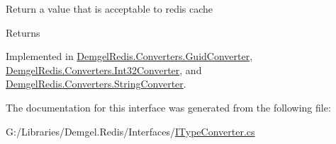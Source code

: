 Return a value that is acceptable to redis cache 

\begin{DoxyReturn}{Returns}

\end{DoxyReturn}


Implemented in \hyperlink{class_demgel_redis_1_1_converters_1_1_guid_converter_a7ac6e5ee049d98717b85caddb7f7403c}{Demgel\+Redis.\+Converters.\+Guid\+Converter}, \hyperlink{class_demgel_redis_1_1_converters_1_1_int32_converter_a318eff3512a40de205c1c518c75f2d9d}{Demgel\+Redis.\+Converters.\+Int32\+Converter}, and \hyperlink{class_demgel_redis_1_1_converters_1_1_string_converter_a94f61749fc10565e355dd19b6ccfbf6a}{Demgel\+Redis.\+Converters.\+String\+Converter}.



The documentation for this interface was generated from the following file\+:\begin{DoxyCompactItemize}
\item 
G\+:/\+Libraries/\+Demgel.\+Redis/\+Interfaces/\hyperlink{_i_type_converter_8cs}{I\+Type\+Converter.\+cs}\end{DoxyCompactItemize}
